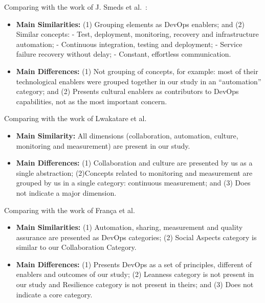 Comparing with the work of J. Smeds et al.~\cite{devops_a_definition_xp_15}:
\begin{itemize}
\item \textbf{Main Similarities:}
  (1) Grouping elements as DevOps enablers; and
  (2) Similar concepts:\newline
    - Test, deployment, monitoring, recovery and infrastructure automation;\newline
    - Continuous integration, testing and deployment;\newline
    - Service failure recovery without delay;\newline
    - Constant, effortless communication.\newline
\item \textbf{Main Differences:}
(1) Not grouping of concepts, for example: most of their technological enablers
were grouped together in our study in an “automation” category; and (2) Presents
cultural enablers as contributors to DevOps capabilities, not as the most
important concern.
\end{itemize}

Comparing with the work of Lwakatare et al.~\cite{extending_dimensions_icsea_16}
\begin{itemize}
\item \textbf{Main Similarity:}
  All dimensions (collaboration, automation, culture, monitoring and measurement)
  are present in our study.

\item \textbf{Main Differences:}
  (1) Collaboration and culture are presented by us as a single abstraction;
  (2)Concepts related to monitoring and measurement are grouped by us in a single
  category: continuous measurement; and (3) Does not indicate a major dimension.
\end{itemize}

Comparing with the work of Fran\c{c}a et al.~\cite{characterizing_devops_sbes_2016}
\begin{itemize}
\item \textbf{Main Similarities:}
  (1) Automation, sharing, measurement and quality assurance are presented as DevOps
  categories;
  (2) Social Aspects category is similar to our Collaboration Category.

\item \textbf{Main Differences:}
  (1) Presents DevOps as a set of principles, different of enablers and outcomes of
  our study;
  (2) Leanness category is not present in our study and Resilience category is not
  present in theirs; and (3) Does not indicate a core category.

\end{itemize}

